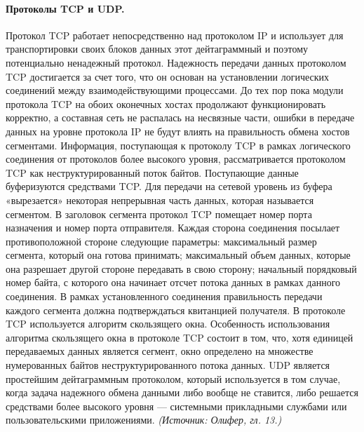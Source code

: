 \documentclass[a4paper,12pt]{article}
\begin{document}
\paragraph{Протоколы TCP и UDP.}
Протокол TCP работает непосредственно над протоколом IP и использует для транспортировки своих блоков данных этот дейтаграммный и поэтому потенциально ненадежный протокол. Надежность передачи данных протоколом TCP достигается за счет того, что он основан на установлении логических соединений между взаимодействующими процессами. До тех пор пока модули протокола TCP на обоих оконечных хостах продолжают функционировать корректно, а составная сеть не распалась на несвязные части, ошибки в передаче данных на уровне протокола IP не будут влиять на правильность обмена хостов сегментами. Информация, поступающая к протоколу TCP в рамках логического соединения от протоколов более высокого уровня, рассматривается протоколом TCP как неструктурированный поток байтов. Поступающие данные буферизуются средствами TCP. Для передачи на сетевой уровень из буфера «вырезается» некоторая непрерывная часть данных, которая называется сегментом. В заголовок сегмента протокол TCP помещает номер порта назначения и номер порта отправителя. Каждая сторона соединения посылает противоположной стороне следующие параметры: максимальный размер сегмента, который она готова принимать; максимальный объем данных, которые она разрешает другой стороне передавать в свою сторону; начальный порядковый номер байта, с которого она начинает отсчет потока данных в рамках данного соединения. В рамках установленного соединения правильность передачи каждого сегмента должна подтверждаться квитанцией получателя. В протоколе TCP используется алгоритм скользящего окна. Особенность использования алгоритма скользящего окна в протоколе TCP состоит в том, что, хотя единицей передаваемых данных является сегмент, окно определено на множестве нумерованных байтов неструктурированного потока данных. UDP является простейшим дейтаграммным протоколом, который используется в том случае, когда задача надежного обмена данными либо вообще не ставится, либо решается средствами более высокого уровня — системными прикладными службами или пользовательскими приложениями.
\textit{(Источник: Олифер, гл. 13.)}
\end{document}
